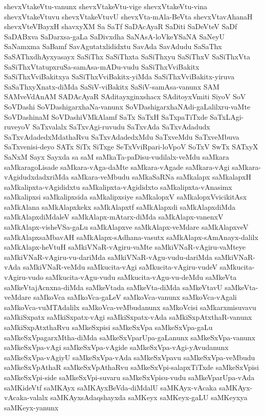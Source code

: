 {shevxVtakeVtu-vanunx
shevxVtakeVtu-vige
shevxVtakeVtu-vina
shevxVtakeVtuvu
shevxVtakeVtuvU
shevxVta-mAla-BeVta
shevxVtavAhanaH
shevxVteVBayxH
shavxyXM
Sa
SaTf
SaDAcAyaR
SaDiti
SaDeVteV
SaDf
SaDABxva
SaDarxsa-gaLa
SaDivxdha
SaNAsA-loVkeYSaNA
SaNeyU
SaNamxma
SaBamf
SavAgutatxlididxtu
SavAda
SavAdudu
SaSaThx
SaSAThxdhAyxyasayx
SaSiThx
SaSiThxta
SaSiThxyu
SaSiThxV
SaSiThxVta
SaSiThxVtatupxruSa-samAsa-mADu-vudu
SaSiThxVviBakitx
SaSiThxVviBakitxya
SaSiThxVviBakitx-yiMda
SaSiThxVviBakitx-yiruva
SaSaThxyXnatx-diMda
SaSiV-viBakitx
SaSiV-samAsa-vanunx
SAM
SAMveVdAnAM
SADAcAyaR
SAditayxginxshacx
SAditoyxVmiti
SiyoV
SoV
SoVDashi
SoVDashigarxhaNa-vanunx
SoVDashigarxhaNAdi-gaLalilxru-vaMte
SoVDashinaM
SoVDashiVMkAlamf
SaTx
SaTxH
SaTxpaTiTxde
SaTxLAgi-ruveyoV
SaTxvalalx
SaTxvAgi-ruvudu
SaTxvAda
SaTxvAdadudx
SaTxvAdadedxMdathaRvu
SaTxvAdadedxMdu
SaTxveMdu
SaTxveMbuva
SaTxvenisi-deyo
SATx
SiTx
SiTxge
SeTxVviRpari-loVpoV
SoTxV
SwTx
SATxyX
SaNxM
Sayx
Sayxda
sa
saM
saMkaTa-paDisu-vudilalx-veMdu
saMkara
saMkaragoLisade
saMkara-vAga-daMte
saMkara-vAgade
saMkara-vAgi
saMkara-vAgidudxdadxriMda
saMkara-veMbudu
saMkaSaRNa
saMkalapx
saMkalapxH
saMkalipxta-vAgididxtu
saMkalipxta-vAgididxto
saMkalipxta-vAnasimx
saMkalipxsi
saMkalipxsida
saMkalipxsiye
saMkalopxV
saMkalopxVvicikitAsx
saMkAlana
saMkAlapxkekx
saMkAlapxtf
saMkAlapxdi
saMkAlapxdiMda
saMkAlapxdiMdaleV
saMkAlapx-mAtarx-diMda
saMkAlapx-vanenxV
saMkAlapx-visheVSa-gaLu
saMkAlapxve
saMkAlapx-veMdare
saMkAlapxveV
saMkAlapxsaMbavAH
saMkAlapx-sAdhana-vasutx
saMkAlapx-sAmAnayx-dalilx
saMkAlapx-heVtuH
saMkiVNaR-vAgiru-vaMte
saMkiVNaR-vAgiru-vaMteye
saMkiVNaR-vAgiru-vu-dariMda
saMkiVNaR-vAgu-vudu-dariMda
saMkiVNaR-vAda
saMkiVNaR-veMdu
saMkucita-vAgi
saMkucita-vAgiru-vudeV
saMkucita-vAgiru-vudo
saMkucita-vAgu-vudu
saMkucita-vAgu-vu-deMdu
saMkeVta
saMkeVtajAcnxna-diMda
saMkeVtada
saMkeVta-diMda
saMkeVtavU
saMkeVta-veMdare
saMkoVca
saMkoVca-gaLeV
saMkoVca-vanunx
saMkoVca-vAgali
saMkoVca-vuMTAdalilx
saMkoVca-veMbudanunx
saMkoVcisi
saMkarxmisuvavu
saMkiSxpatx
saMkiSxpatx-vAgi
saMkiSxpatx-vAda
saMkiSxpAtxthaR-vanunx
saMkiSxpAtxthaRvu
saMkeSxpisi
saMkeSxVpa
saMkeSxVpa-gaLu
saMkeSxVpagarxMtha-diMda
saMkeSxVparUpa-gaLanunx
saMkeSxVpa-vanunx
saMkeSxVpa-vAgi
saMkeSxVpa-vAgide
saMkeSxVpa-vAgi-yAvudanunx
saMkeSxVpa-vAgiyU
saMkeSxVpa-vAda
saMkeSxVpavu
saMkeSxVpa-veMbudu
saMkeSxVpAthaR
saMkeSxVpAthaRvu
saMkeSxVpi-salapxTiTxde
saMkeSxVpisi
saMkeSxVpi-side
saMkeSxVpi-suvaru
saMkeSxVpisu-vudu
saMkeVparUpa-vAda
saMKideVtf
saMKAyx
saMKAyxBeVda-diMdalU
saMKAyx-vAcaka
saMKAyx-vAcaka-valalx
saMKAyxsAdaqshayxda
saMKeyx
saMKeyx-gaLU
saMKeyxya
saMKeyx-yanunx
}
